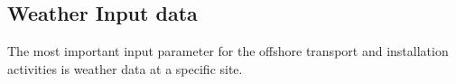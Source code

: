 \subsection{Weather Input data}

The most important input parameter for the offshore transport and installation activities is weather data at a specific site. 